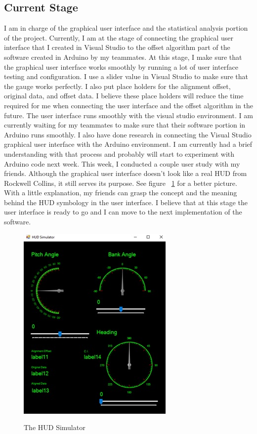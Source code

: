 \subsection{Current Stage}
I am in charge of the graphical user interface and the statistical analysis portion of the project. Currently, I am at the stage of connecting the graphical user interface that I created in Visual Studio to the offset algorithm part of the software created in Arduino by my teammates. At this stage, I make sure that the graphical user interface works smoothly by running a lot of user interface testing and configuration. I use a slider value in Visual Studio to make sure that the gauge works perfectly. I also put place holders for the alignment offset, original data, and offset data. I believe these place holders will reduce the time required for me when connecting the user interface and the offset algorithm in the future. The user interface runs smoothly with the visual studio environment. I am currently waiting for my teammates to make sure that their software portion in Arduino runs smoothly. I also have done research in connecting the Visual Studio graphical user interface with the Arduino environment. I am currently had a brief understanding with that process and probably will start to experiment with Arduino code next week. This week, I conducted a couple user study with my friends. Although the graphical user interface doesn’t look like a real HUD from Rockwell Collins, it still serves its purpose. See figure ~\ref{fig:hudsim} for a better picture. With a little explanation, my friends can grasp the concept and the meaning behind the HUD symbology in the user interface. I believe that at this stage the user interface is ready to go and I can move to the next implementation of the software. 

\begin{figure}
    \caption{The HUD Simulator}
    \includegraphics{img/hudsim}
    \label{fig:hudsim}
\end{figure}

